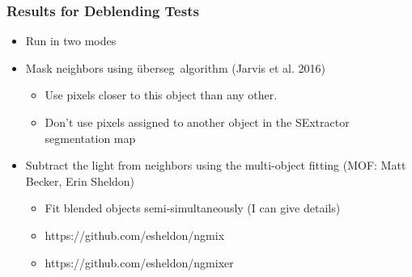 \documentclass{beamer}
\newcommand{\uberseg}{{\"u}berseg}
\begin{document}
\frame
{

    \frametitle{Results for Deblending Tests}


    \begin{itemize}

        \item Run in two modes
        \item Mask neighbors using \uberseg\ algorithm (Jarvis et al. 2016)
            \begin{itemize}
                \item Use pixels closer to this object than any other.
                \item Don't use pixels assigned to another
                    object in the SExtractor segmentation map
            \end{itemize}

        \item Subtract the light from neighbors using the multi-object
            fitting (MOF: Matt Becker, Erin Sheldon)
            \begin{itemize}
                \item Fit blended objects semi-simultaneously (I can give details)
                \item https://github.com/esheldon/ngmix
                \item https://github.com/esheldon/ngmixer
            \end{itemize}


    \end{itemize}


}
\end{document}
